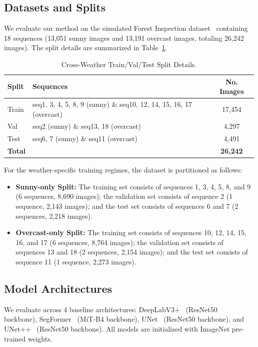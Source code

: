 \documentclass[journal,compsoc]{IEEEtran}
\begin{document}
\subsection{Datasets and Splits}
We evaluate our method on the simulated Forest Inspection dataset~\cite{forestdataset} containing 18 sequences (13,051 sunny images and 13,191 overcast images, totaling 26,242 images). The split details are summarized in Table~\ref{tab:dataset_split}.

\begin{table}[t]
\centering
\caption{Cross-Weather Train/Val/Test Split Details.}
\label{tab:dataset_split}
\small
\begin{tabularx}{\textwidth}{lXc}
\toprule
\textbf{Split} & \textbf{Sequences} & \textbf{No. Images} \\
\midrule
Train & seq1, 3, 4, 5, 8, 9 (sunny) \& seq10, 12, 14, 15, 16, 17 (overcast) & 17,454 \\
Val   & seq2 (sunny) \& seq13, 18 (overcast) & 4,297 \\
Test  & seq6, 7 (sunny) \& seq11 (overcast) & 4,491 \\
\midrule
\textbf{Total} & & \textbf{26,242} \\
\bottomrule
\end{tabularx}
\end{table}

For the weather-specific training regimes, the dataset is partitioned as follows:
\begin{itemize}
    \item \textbf{Sunny-only Split:} The training set consists of sequences 1, 3, 4, 5, 8, and 9 (6 sequences, 8,690 images); the validation set consists of sequence 2 (1 sequence, 2,143 images); and the test set consists of sequences 6 and 7 (2 sequences, 2,218 images).
    \item \textbf{Overcast-only Split:} The training set consists of sequences 10, 12, 14, 15, 16, and 17 (6 sequences, 8,764 images); the validation set consists of sequences 13 and 18 (2 sequences, 2,154 images); and the test set consists of sequence 11 (1 sequence, 2,273 images).
\end{itemize}

\subsection{Model Architectures}
We evaluate across 4 baseline architectures: DeepLabV3+~\cite{chen2018deeplabv3plus} (ResNet50~\cite{he2016resnet} backbone), SegFormer~\cite{xie2021segformer} (MiT-B4 backbone), UNet~\cite{ronneberger2015unet} (ResNet50 backbone), and UNet++~\cite{zhou2018unetpp} (ResNet50 backbone). All models are initialized with ImageNet pre-trained weights.
\end{document}
